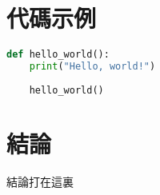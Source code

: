 \documentclass{article}
\begin{document}
\section{代碼示例}
\begin{lstlisting}[language=Python, caption=Python 代碼示例]
	def hello_world():
	print("Hello, world!")
	
	hello_world()
\end{lstlisting}
	
\section{結論}
結論打在這裏
	
\end{document}

